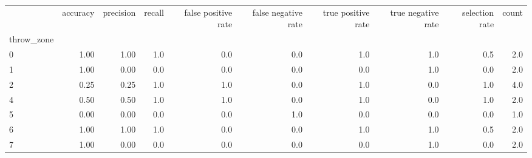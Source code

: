 \begin{tabular}{lrrrrrrrrr}
\toprule
{} &  accuracy &  precision &  recall &  false positive rate &  false negative rate &  true positive rate &  true negative rate &  selection rate &  count \\
throw\_zone &           &            &         &                      &                      &                     &                     &                 &        \\
\midrule
0          &      1.00 &       1.00 &     1.0 &                  0.0 &                  0.0 &                 1.0 &                 1.0 &             0.5 &    2.0 \\
1          &      1.00 &       0.00 &     0.0 &                  0.0 &                  0.0 &                 0.0 &                 1.0 &             0.0 &    2.0 \\
2          &      0.25 &       0.25 &     1.0 &                  1.0 &                  0.0 &                 1.0 &                 0.0 &             1.0 &    4.0 \\
4          &      0.50 &       0.50 &     1.0 &                  1.0 &                  0.0 &                 1.0 &                 0.0 &             1.0 &    2.0 \\
5          &      0.00 &       0.00 &     0.0 &                  0.0 &                  1.0 &                 0.0 &                 0.0 &             0.0 &    1.0 \\
6          &      1.00 &       1.00 &     1.0 &                  0.0 &                  0.0 &                 1.0 &                 1.0 &             0.5 &    2.0 \\
7          &      1.00 &       0.00 &     0.0 &                  0.0 &                  0.0 &                 0.0 &                 1.0 &             0.0 &    2.0 \\
\bottomrule
\end{tabular}
